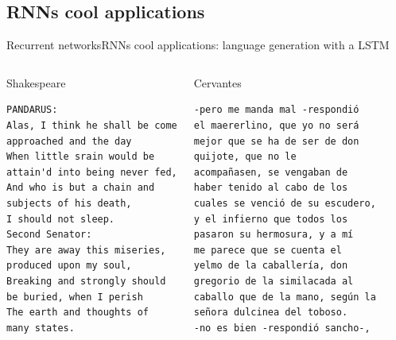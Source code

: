 \documentclass[10pt,compress]{beamer} %
\begin{document}
\subsection{RNNs cool applications}
\begin{frame}{Recurrent networks}{RNNs cool applications: language generation with a LSTM} 
    \small
    \begin{columns}
       \begin{exampleblock}{Shakespeare}
\begin{verbatim}
PANDARUS:
Alas, I think he shall be come
approached and the day
When little srain would be
attain'd into being never fed,
And who is but a chain and
subjects of his death,
I should not sleep.
Second Senator:
They are away this miseries,
produced upon my soul,
Breaking and strongly should
be buried, when I perish
The earth and thoughts of
many states.
\end{verbatim}
       \end{exampleblock}

       \begin{exampleblock}{Cervantes}
\begin{verbatim}
-pero me manda mal -respondió
el maererlino, que yo no será
mejor que se ha de ser de don
quijote, que no le
acompañasen, se vengaban de
haber tenido al cabo de los
cuales se venció de su escudero,
y el infierno que todos los
pasaron su hermosura, y a mí
me parece que se cuenta el
yelmo de la caballería, don
gregorio de la similacada al
caballo que de la mano, según la
señora dulcinea del toboso.
-no es bien -respondió sancho-,
\end{verbatim}
       \end{exampleblock}
    \end{columns}
\end{frame}
\end{document}
